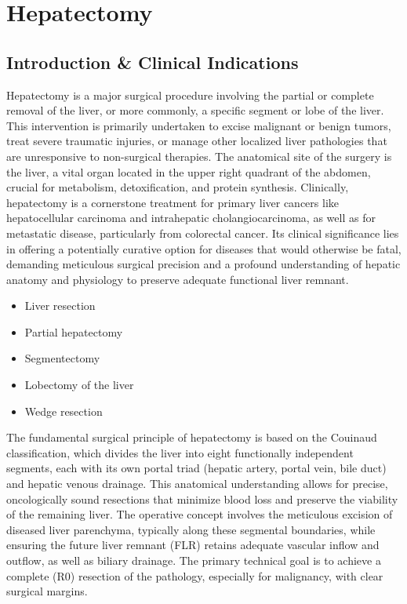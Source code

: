 \chapter{Hepatectomy}

\section*{Introduction \& Clinical Indications}
Hepatectomy is a major surgical procedure involving the partial or complete removal of the liver, or more commonly, a specific segment or lobe of the liver. This intervention is primarily undertaken to excise malignant or benign tumors, treat severe traumatic injuries, or manage other localized liver pathologies that are unresponsive to non-surgical therapies. The anatomical site of the surgery is the liver, a vital organ located in the upper right quadrant of the abdomen, crucial for metabolism, detoxification, and protein synthesis. Clinically, hepatectomy is a cornerstone treatment for primary liver cancers like hepatocellular carcinoma and intrahepatic cholangiocarcinoma, as well as for metastatic disease, particularly from colorectal cancer. Its clinical significance lies in offering a potentially curative option for diseases that would otherwise be fatal, demanding meticulous surgical precision and a profound understanding of hepatic anatomy and physiology to preserve adequate functional liver remnant.

\begin{itemize}
  \item Liver resection
  \item Partial hepatectomy
  \item Segmentectomy
  \item Lobectomy of the liver
  \item Wedge resection
\end{itemize}

The fundamental surgical principle of hepatectomy is based on the Couinaud classification, which divides the liver into eight functionally independent segments, each with its own portal triad (hepatic artery, portal vein, bile duct) and hepatic venous drainage. This anatomical understanding allows for precise, oncologically sound resections that minimize blood loss and preserve the viability of the remaining liver. The operative concept involves the meticulous excision of diseased liver parenchyma, typically along these segmental boundaries, while ensuring the future liver remnant (FLR) retains adequate vascular inflow and outflow, as well as biliary drainage. The primary technical goal is to achieve a complete (R0) resection of the pathology, especially for malignancy, with clear surgical margins.

